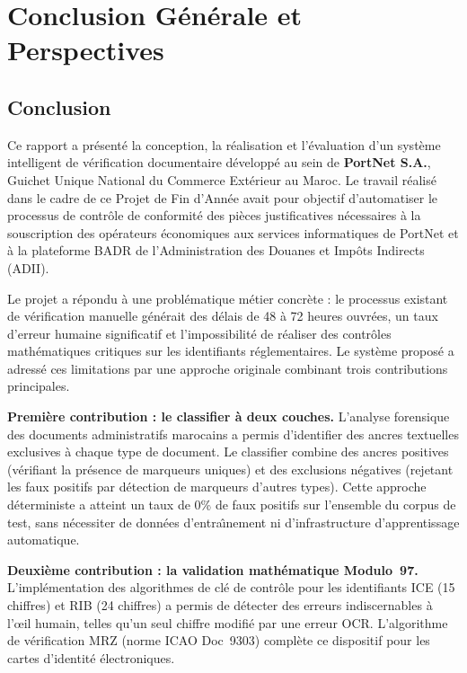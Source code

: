 \chapter*{Conclusion G\'{e}n\'{e}rale et Perspectives}

\section*{Conclusion}

Ce rapport a pr\'{e}sent\'{e} la conception, la r\'{e}alisation et l'\'{e}valuation d'un syst\`{e}me intelligent de v\'{e}rification documentaire d\'{e}velopp\'{e} au sein de \textbf{PortNet S.A.}, Guichet Unique National du Commerce Ext\'{e}rieur au Maroc. Le travail r\'{e}alis\'{e} dans le cadre de ce Projet de Fin d'Ann\'{e}e avait pour objectif d'automatiser le processus de contr\^{o}le de conformit\'{e} des pi\`{e}ces justificatives n\'{e}cessaires \`{a} la souscription des op\'{e}rateurs \'{e}conomiques aux services informatiques de PortNet et \`{a} la plateforme BADR de l'Administration des Douanes et Imp\^{o}ts Indirects (ADII).

Le projet a r\'{e}pondu \`{a} une probl\'{e}matique m\'{e}tier concr\`{e}te : le processus existant de v\'{e}rification manuelle g\'{e}n\'{e}rait des d\'{e}lais de 48 \`{a} 72 heures ouvr\'{e}es, un taux d'erreur humaine significatif et l'impossibilit\'{e} de r\'{e}aliser des contr\^{o}les math\'{e}matiques critiques sur les identifiants r\'{e}glementaires. Le syst\`{e}me propos\'{e} a adress\'{e} ces limitations par une approche originale combinant trois contributions principales.

\textbf{Premi\`{e}re contribution : le classifier \`{a} deux couches.} L'analyse forensique des documents administratifs marocains a permis d'identifier des ancres textuelles exclusives \`{a} chaque type de document. Le classifier combine des ancres positives (v\'{e}rifiant la pr\'{e}sence de marqueurs uniques) et des exclusions n\'{e}gatives (rejetant les faux positifs par d\'{e}tection de marqueurs d'autres types). Cette approche d\'{e}terministe a atteint un taux de 0\% de faux positifs sur l'ensemble du corpus de test, sans n\'{e}cessiter de donn\'{e}es d'entra\^{\i}nement ni d'infrastructure d'apprentissage automatique.

\textbf{Deuxi\`{e}me contribution : la validation math\'{e}matique Modulo~97.} L'impl\'{e}mentation des algorithmes de cl\'{e} de contr\^{o}le pour les identifiants ICE (15 chiffres) et RIB (24 chiffres) a permis de d\'{e}tecter des erreurs indiscernables \`{a} l'\oe{}il humain, telles qu'un seul chiffre modifi\'{e} par une erreur OCR. L'algorithme de v\'{e}rification MRZ (norme ICAO Doc~9303) compl\`{e}te ce dispositif pour les cartes d'identit\'{e} \'{e}lectroniques.

